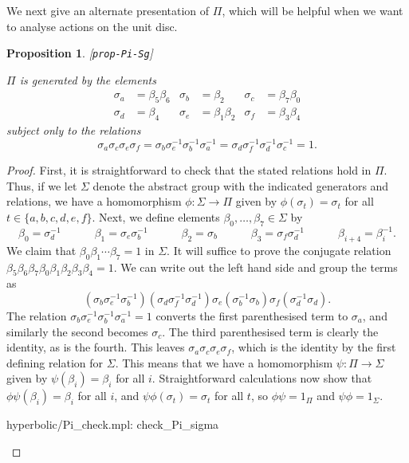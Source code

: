 \documentclass[reqno]{amsart}
\newcommand{\lbl}[1]{\label{#1}\textup{[\texttt{#1}]}\par}
\newcommand{\lbl}{\label}
\newcommand{\Sg}        {\Sigma}
\newcommand{\bt}        {\beta}
\newcommand{\sg}        {\sigma}
\renewcommand{\:}{\colon}
\newtheorem{proposition}[theorem]{Proposition}
\theoremstyle{definition}
\begin{document}
We next give an alternate presentation of $\Pi$, which will be helpful
when we want to analyse actions on the unit disc.
\begin{proposition}\lbl{prop-Pi-Sg}
 $\Pi$ is generated by the elements
 \begin{align*}
  \sg_a &= \bt_5\bt_6 &
  \sg_b &= \bt_2      &
  \sg_c &= \bt_7\bt_0 \\
  \sg_d &= \bt_4      &
  \sg_e &= \bt_1\bt_2 &
  \sg_f &= \bt_3\bt_4
 \end{align*}
 subject only to the relations
 \[ \sg_a\sg_c\sg_e\sg_f =
    \sg_b\sg_e^{-1}\sg_b^{-1}\sg_a^{-1} =
    \sg_d\sg_f^{-1}\sg_d^{-1}\sg_c^{-1} = 1.
 \]
\end{proposition}
\begin{proof}
 First, it is straightforward to check that the stated relations hold
 in $\Pi$.  Thus, if we let $\Sg$ denote the abstract group with the
 indicated generators and relations, we have a homomorphism
 $\phi\:\Sg\to\Pi$ given by $\phi(\sg_t)=\sg_t$ for all
 $t\in\{a,b,c,d,e,f\}$.  Next, we define elements
 $\bt_0,\dotsc,\bt_7\in\Sg$ by
 \[ \bt_0 = \sg_d^{-1}      \hspace{3em}
    \bt_1 = \sg_e\sg_b^{-1} \hspace{3em}
    \bt_2 = \sg_b           \hspace{3em}
    \bt_3 = \sg_f\sg_d^{-1} \hspace{3em}
    \bt_{i+4}=\bt_i^{-1}.
 \]
 We claim that $\bt_0\bt_1\dotsb\bt_7=1$ in $\Sg$.  It will suffice to
 prove the conjugate relation
 $\bt_5\bt_6\bt_7\bt_0\bt_1\bt_2\bt_3\bt_4=1$.  We can write out the
 left hand side and group the terms as
 \[ (\sg_b\sg_e^{-1}\sg_b^{-1})(\sg_d\sg_f^{-1}\sg_d^{-1})
    \sg_e(\sg_b^{-1}\sg_b)\sg_f(\sg_d^{-1}\sg_d).
 \]
 The relation $\sg_b\sg_e^{-1}\sg_b^{-1}\sg_a^{-1}=1$ converts the
 first parenthesised term to $\sg_a$, and similarly the second becomes
 $\sg_c$.  The third parenthesised term is clearly the identity, as is
 the fourth.  This leaves $\sg_a\sg_c\sg_e\sg_f$, which is the
 identity by the first defining relation for $\Sg$.  This means that
 we have a homomorphism $\psi\:\Pi\to\Sg$ given by $\psi(\bt_i)=\bt_i$
 for all $i$.  Straightforward calculations now show that
 $\phi\psi(\bt_i)=\bt_i$ for all $i$, and $\psi\phi(\sg_t)=\sg_t$ for
 all $t$, so $\phi\psi=1_\Pi$ and $\psi\phi=1_\Sg$.
 \begin{checks}
  hyperbolic/Pi_check.mpl: check_Pi_sigma
 \end{checks}
\end{proof}
\end{document}
